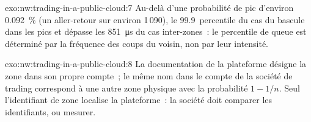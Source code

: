 \begin{solution}{exo:nw:trading-in-a-public-cloud:7}
Au-delà d'une probabilité de pic d'environ 0.092~\% (un aller-retour sur environ 1\,090), le 99.9~percentile du cas du  bascule dans les pics et dépasse
les \qty{851}{\micro\second} du cas inter-zones~: le percentile de queue est déterminé par la fréquence des coups du voisin, non par leur intensité.
\end{solution}

\begin{solution}{exo:nw:trading-in-a-public-cloud:8}
La documentation de la plateforme désigne la zone dans son propre compte~; le même nom dans le compte de la société de trading correspond à une autre zone physique avec la probabilité
$1 - 1/n$. Seul l'identifiant de zone localise la plateforme~: la société doit comparer les identifiants, ou mesurer.
\end{solution}

